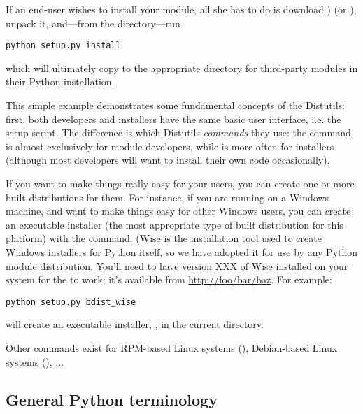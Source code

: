 \documentclass{howto}
\begin{document}
If an end-user wishes to install your  module, all she has
to do is download ) (or ), unpack it,
and---from the  directory---run
\begin{verbatim}
python setup.py install
\end{verbatim}
which will ultimately copy  to the appropriate directory
for third-party modules in their Python installation.

This simple example demonstrates some fundamental concepts of the
Distutils: first, both developers and installers have the same basic
user interface, i.e. the setup script.  The difference is which
Distutils \emph{commands} they use: the  command is
almost exclusively for module developers, while  is
more often for installers (although most developers will want to install
their own code occasionally).

%
If you want to make things really easy for your users, you can create
one or more built distributions for them.  For instance, if you are
running on a Windows machine, and want to make things easy for other
Windows users, you can create an executable installer (the most
appropriate type of built distribution for this platform) with the
 command.  (Wise is the installation tool used to
create Windows installers for Python itself, so we have adopted it for
use by any Python module distribution.  You'll need to have version XXX
of Wise installed on your system for the  to work;
it's available from \url{http://foo/bar/baz}.  For example:
\begin{verbatim}
python setup.py bdist_wise
\end{verbatim}
will create an executable installer, , in the current
directory.

Other  commands exist for RPM-based Linux systems
(), Debian-based Linux systems
(), ...


\subsection{General Python terminology}
\label{sec:python-terms}
\end{document}
